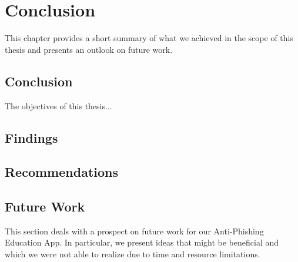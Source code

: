 \section{Conclusion}
\label{s:conclusion}

This chapter provides a short summary of what we achieved in the scope of this thesis and presents an outlook on future work.


\subsection{Conclusion}

The objectives of this thesis... 

\subsection{Findings}
\subsection{Recommendations}
\subsection{Future Work}
This section deals with a prospect on future work for our Anti-Phishing Education App. In particular, we present ideas that might be beneficial and which we were not able to realize due to time and resource limitations.